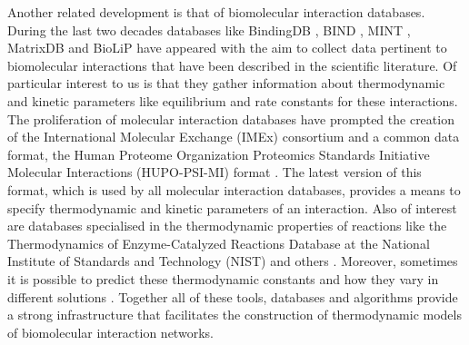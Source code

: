 




Another related development is that of
biomolecular interaction databases.
During the last two decades
databases like BindingDB \citep{bindingdb,bindingdb15},
BIND \citep{bind}, MINT \citep{mint,mint12},
MatrixDB \citep{matrixdb09} and BioLiP \citep{biolip} have appeared
with the aim to collect data pertinent to biomolecular interactions
that have been described in the scientific literature.
Of particular interest to us is that they gather information
about thermodynamic and kinetic parameters
like equilibrium and rate constants for these interactions.
The proliferation of molecular interaction databases
have prompted the creation of
the International Molecular Exchange (IMEx) consortium \citep{imex}
and a common data format,
the Human Proteome Organization Proteomics Standards Initiative
Molecular Interactions (HUPO-PSI-MI) format
\citep{hupo-psi-mi-1,hupo-psi-mi-2.5}.
The latest version of this format,
which is used by all molecular interaction databases,
provides a means to specify
thermodynamic and kinetic parameters of an interaction.
%
Also of interest are databases
specialised in the thermodynamic properties of reactions like
the Thermodynamics of Enzyme-Catalyzed Reactions Database
at the National Institute of Standards and Technology (NIST)
\citep{tecrdb} and others \citep{biocoda-thermo}.
Moreover, sometimes it is possible to predict these %
thermodynamic constants and how they vary in different solutions
\citep{equilibrator,group-contrib}.
Together all of these tools, databases and algorithms
provide a strong infrastructure that facilitates the construction
of thermodynamic models of biomolecular interaction networks.

